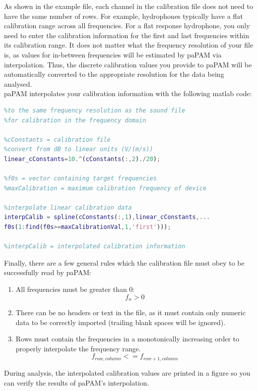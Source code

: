 \documentclass[11pt]{report}
\begin{document}
As shown in the example file, each channel in the calibration file does not need to have the same number of rows.
For example, hydrophones typically have a flat calibration range across all frequencies.
For a flat response hydrophone, you only need to enter the calibration information for the first and last frequencies within its calibration range.
It does not matter what the frequency resolution of your file is, as values for in-between frequencies will be estimated by paPAM via interpolation.
Thus, the discrete calibration values you provide to paPAM will be automatically converted to the appropriate resolution for the data being analysed.\\

	paPAM interpolates your calibration information with the following matlab code:

\begin{lstlisting}[style=github, language=MATLAB]
%Interpolate the first 2 columns of the calibration file
%to the same frequency resolution as the sound file
%for calibration in the frequency domain

%cConstants = calibration file
%convert from dB to linear units (V/(m/s))
linear_cConstants=10.^(cConstants(:,2)./20);

%f0s = vector containing target frequencies
%maxCalibration = maximum calibration frequency of device

%interpolate linear calibration data
interpCalib = spline(cConstants(:,1),linear_cConstants,...
f0s(1:find(f0s>=maxCalibrationVal,1,'first')));

%interpCalib = interpolated calibration information

\end{lstlisting}


Finally, there are a few general rules which the calibration file must obey to be successfully read by paPAM:
\begin{enumerate}
\item All frequencies must be greater than 0: $$f_n > 0$$
\item There can be no headers or text in the file, as it must contain only numeric data to be correctly imported (trailing blank spaces will be ignored).
\item Rows must contain the frequencies in a monotonically increasing order to properly interpolate the frequency range. $$f_{row, column} <= f_{row+1, column} $$
\end{enumerate}


	During analysis, the interpolated calibration values are printed in a figure so you can verify the results of paPAM's interpolation.
\end{document}
